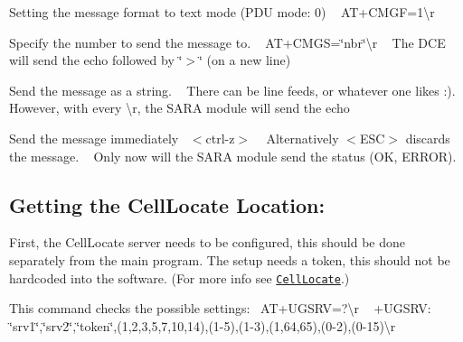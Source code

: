 \begin{DoxyEnumerate}
\item Setting the message format to text mode (P\+DU mode\+: 0) ~\newline
 {\ttfamily A\+T+\+C\+M\+GF=1\textbackslash{}r}
\end{DoxyEnumerate}
\begin{DoxyEnumerate}
\item Specify the number to send the message to. ~\newline
 {\ttfamily A\+T+\+C\+M\+GS=\char`\"{}nbr\char`\"{}\textbackslash{}r} ~\newline
 The D\+CE will send the echo followed by \char`\"{}$>$\char`\"{} (on a new line)
\end{DoxyEnumerate}
\begin{DoxyEnumerate}
\item Send the message as a string. ~\newline
 {\ttfamily There can be line feeds, or whatever one likes \+:). However, with every \textbackslash{}r, the S\+A\+RA module will send the echo}
\end{DoxyEnumerate}
\begin{DoxyEnumerate}
\item Send the message immediately~\newline
 {\ttfamily $<$ctrl-\/z$>$} ~\newline
 Alternatively {\ttfamily $<$E\+SC$>$} discards the message. ~\newline
 Only now will the S\+A\+RA module send the status (OK, E\+R\+R\+OR).
\end{DoxyEnumerate}

\subsection*{Getting the Cell\+Locate Location\+:}

First, the Cell\+Locate server needs to be configured, this should be done separately from the main program. The setup needs a token, this should not be hardcoded into the software. (For more info see \href{#celllocate}{\tt Cell\+Locate}.)

This command checks the possible settings\+:~\newline
 {\ttfamily A\+T+\+U\+G\+S\+RV=?\textbackslash{}r} ~\newline
 {\ttfamily +\+U\+G\+S\+RV\+: \char`\"{}srv1\char`\"{},\char`\"{}srv2\char`\"{},\char`\"{}token\char`\"{},(1,2,3,5,7,10,14),(1-\/5),(1-\/3),(1,64,65),(0-\/2),(0-\/15)\textbackslash{}r} ~\newline

